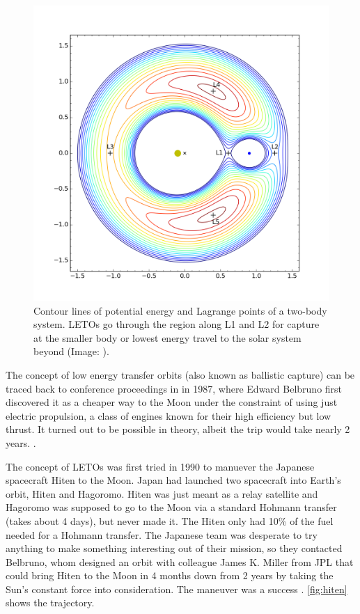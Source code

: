 \begin{figure}[ht]
    \centering
    \includegraphics[width=0.65\linewidth]{fig/lagrange-points-energy-contour-lines.png}
    \caption{Contour lines of potential energy and Lagrange points of a two-body system. LETOs go through the region along L1 and L2 for capture at the smaller body or lowest energy travel to the solar system beyond (Image: \cite{Drang}).}
    \label{fig:lagrange-points-energy-contour-lines}
\end{figure}


The concept of low energy transfer orbits (also known as ballistic capture) can be traced back to conference proceedings in in 1987, where Edward Belbruno first discovered it as a cheaper way to the Moon under the constraint of using just electric propulsion, a class of engines known for their high efficiency but low thrust. It turned out to be possible in theory, albeit the trip would take nearly 2 years. \cite{Belbruno1987} \cite{Benson}.



The concept of LETOs was first tried in 1990 to manuever the Japanese spacecraft Hiten to the Moon. Japan had launched two spacecraft into Earth's orbit, Hiten and Hagoromo. Hiten was just meant as a relay satellite and Hagoromo was supposed to go to the Moon via a standard Hohmann transfer (takes about 4 days), but never made it. The Hiten only had 10\% of the fuel needed for a Hohmann transfer. The Japanese team was desperate to try anything to make something interesting out of their mission, so they contacted Belbruno, whom designed an orbit with colleague James K. Miller from JPL that could bring Hiten to the Moon in 4 months down from 2 years by taking the Sun's constant force into consideration. The maneuver was a success \cite{Belbuno1990} \cite{Benson}. \cref{fig:hiten} shows the trajectory.

